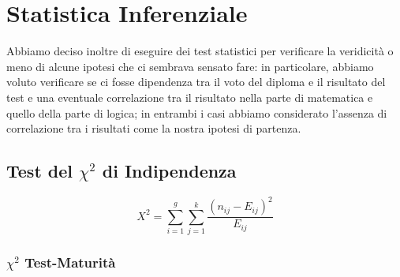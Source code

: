 \section{Statistica Inferenziale}
Abbiamo deciso inoltre di eseguire dei test statistici per verificare la veridicità o meno di alcune ipotesi che ci sembrava sensato fare: in particolare, abbiamo voluto verificare se ci fosse dipendenza tra il voto del diploma e il risultato del test e una eventuale correlazione tra il risultato nella parte di matematica e quello della parte di logica; in entrambi i casi abbiamo considerato l’assenza di correlazione tra i risultati come la nostra ipotesi di partenza.

\subsection{Test del $\chi^2$ di Indipendenza}

\[
X^2 = \sum_{i=1}^g\sum_{j=1}^k\frac{(n_{ij} - E_{ij})^2}{E_{ij}}
\]

\subsubsection{$\chi^2$ Test-Maturità}

\begin{center}
\end{center}


\begin{center}
\end{center}

